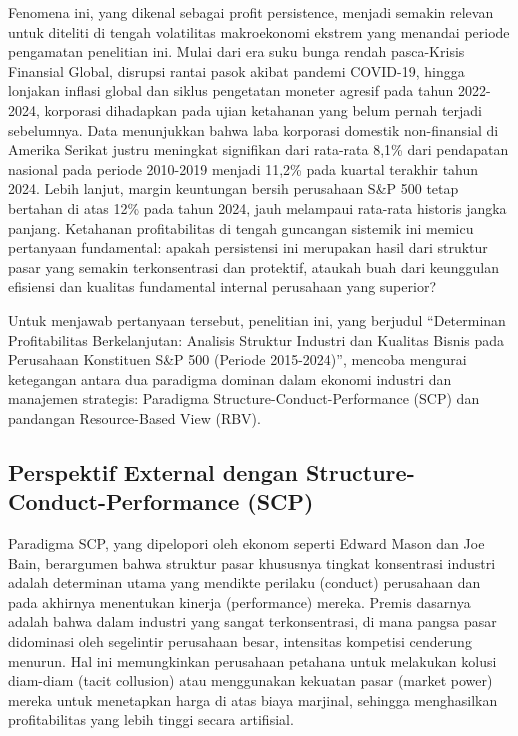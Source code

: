 \documentclass[12pt,a4paper]{report}
\begin{document}
Fenomena ini, yang dikenal sebagai profit persistence, menjadi semakin
relevan untuk diteliti di tengah volatilitas makroekonomi ekstrem yang
menandai periode pengamatan penelitian ini. Mulai dari era suku bunga
rendah pasca-Krisis Finansial Global, disrupsi rantai pasok akibat
pandemi COVID-19, hingga lonjakan inflasi global dan siklus pengetatan
moneter agresif pada tahun 2022-2024, korporasi dihadapkan pada ujian
ketahanan yang belum pernah terjadi sebelumnya. Data menunjukkan bahwa
laba korporasi domestik non-finansial di Amerika Serikat justru
meningkat signifikan dari rata-rata 8,1\% dari pendapatan nasional pada
periode 2010-2019 menjadi 11,2\% pada kuartal terakhir tahun 2024. Lebih
lanjut, margin keuntungan bersih perusahaan S\&P 500 tetap bertahan di
atas 12\% pada tahun 2024, jauh melampaui rata-rata historis jangka
panjang. Ketahanan profitabilitas di tengah guncangan sistemik ini
memicu pertanyaan fundamental: apakah persistensi ini merupakan hasil
dari struktur pasar yang semakin terkonsentrasi dan protektif, ataukah
buah dari keunggulan efisiensi dan kualitas fundamental internal
perusahaan yang superior?

Untuk menjawab pertanyaan tersebut, penelitian ini, yang berjudul
``Determinan Profitabilitas Berkelanjutan: Analisis Struktur Industri
dan Kualitas Bisnis pada Perusahaan Konstituen S\&P 500 (Periode
2015-2024)'', mencoba mengurai ketegangan antara dua paradigma dominan
dalam ekonomi industri dan manajemen strategis: Paradigma
Structure-Conduct-Performance (SCP) dan pandangan Resource-Based View
(RBV).

\hypertarget{perspektif-external-dengan-structure-conduct-performance-scp}{%
\subsection{Perspektif External dengan Structure-Conduct-Performance
(SCP)}\label{perspektif-external-dengan-structure-conduct-performance-scp}}

Paradigma SCP, yang dipelopori oleh ekonom seperti Edward Mason dan Joe
Bain, berargumen bahwa struktur pasar khususnya tingkat konsentrasi
industri adalah determinan utama yang mendikte perilaku (conduct)
perusahaan dan pada akhirnya menentukan kinerja (performance) mereka.
Premis dasarnya adalah bahwa dalam industri yang sangat terkonsentrasi,
di mana pangsa pasar didominasi oleh segelintir perusahaan besar,
intensitas kompetisi cenderung menurun. Hal ini memungkinkan perusahaan
petahana untuk melakukan kolusi diam-diam (tacit collusion) atau
menggunakan kekuatan pasar (market power) mereka untuk menetapkan harga
di atas biaya marjinal, sehingga menghasilkan profitabilitas yang lebih
tinggi secara artifisial.
\end{document}

